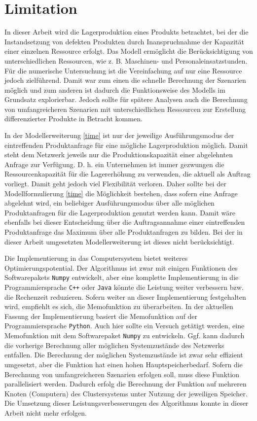 \section*{Limitation}
In dieser Arbeit wird die Lagerproduktion eines Produkts betrachtet, bei der die Instandsetzung von defekten Produkten durch Inanspruchnahme der Kapazität einer einzelnen Ressource erfolgt. Das Modell ermöglicht die Berücksichtigung von unterschiedlichen Ressourcen, wie z. B. Maschinen- und Personaleinsatzstunden. Für die numerische Untersuchung ist die Vereinfachung auf nur eine Ressource jedoch zielführend. Damit war zum einen die schnelle Berechnung der Szenarien möglich und zum anderen ist dadurch die Funktionsweise des Modells im Grundsatz explorierbar. Jedoch sollte für spätere Analysen auch die Berechnung von umfangreicheren Szenarien mit unterschiedlichen Ressourcen zur Erstellung differenzierter Produkte in Betracht kommen.

In der Modellerweiterung \eqref{time} ist nur der jeweilige Ausführungsmodus der eintreffenden Produktanfrage für eine mögliche Lagerproduktion möglich. Damit steht dem Netzwerk jeweils nur die Produktionskapazität einer abgelehnten Anfrage zur Verfügung. D. h. ein Unternehmen ist immer gezwungen die Ressourcenkapazität für die Lagererhöhung zu verwenden, die aktuell als Auftrag vorliegt. Damit geht jedoch viel Flexibilität verloren. Daher sollte bei der Modellformulierung \eqref{time} die Möglichkeit bestehen, dass sofern eine Anfrage abgelehnt wird, ein beliebiger Ausführungsmodus über alle möglichen Produktanfragen für die Lagerproduktion genutzt werden kann. Damit wäre ebenfalls bei dieser Entscheidung über die Auftragsannahme einer eintreffenden Produktanfrage das Maximum über alle Produktanfragen zu bilden. Bei der in dieser Arbeit umgesetzten Modellerweiterung ist dieses nicht berücksichtigt.

Die Implementierung in das Computersystem bietet weiteres Optimierungspotential. Der Algorithmus ist zwar mit einigen Funktionen des Softwarepakets \texttt{Numpy} entwickelt, aber eine komplette Implementierung in die Programmiersprache \texttt{C++} oder \texttt{Java} könnte die Leistung weiter verbessern bzw. die Rechenzeit reduzieren. Sofern weiter an dieser Implementierung festgehalten wird, empfiehlt es sich, die Memofunktion zu überarbeiten. In der aktuellen Fassung der Implementierung basiert die Memofunktion auf der Programmiersprache \texttt{Python}. Auch hier sollte ein Versuch getätigt werden, eine Memofunktion mit dem Softwarepaket \texttt{Numpy} zu entwickeln. Ggf. kann dadurch die vorherige Berechnung aller möglichen Systemzustände des Netzwerks entfallen. Die Berechnung der möglichen Systemzustände ist zwar sehr effizient umgesetzt, aber die Funktion hat einen hohen Hauptspeicherbedarf. Sofern die Berechnung von umfangreicheren Szenarien erfolgen soll, muss diese Funktion parallelisiert werden. Dadurch erfolg die Berechnung der Funktion auf mehreren Knoten (Computern) des Clustersystems unter Nutzung der jeweiligen Speicher. Die Umsetzung dieser Leistungsverbesserungen des Algorithmus konnte in dieser Arbeit nicht mehr erfolgen.

